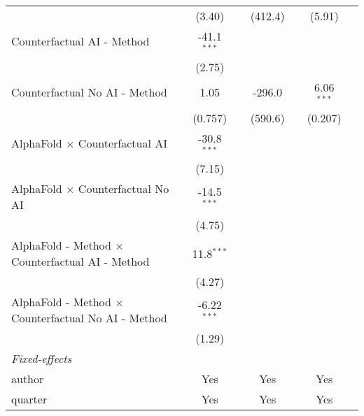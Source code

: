 \begin{tabular}{lcccccc}
                                                              & (3.40)        &      & (412.4)      &      & (5.91)        &   \\   
   Counterfactual AI - Method                                 & -41.1$^{***}$ &      &              &      &               &   \\   
                                                              & (2.75)        &      &              &      &               &   \\   
   Counterfactual No AI - Method                              & 1.05          &      & -296.0       &      & 6.06$^{***}$  &   \\   
                                                              & (0.757)       &      & (590.6)      &      & (0.207)       &   \\   
   AlphaFold $\times$ Counterfactual AI                       & -30.8$^{***}$ &      &              &      &               &   \\   
                                                              & (7.15)        &      &              &      &               &   \\   
   AlphaFold $\times$ Counterfactual No AI                    & -14.5$^{***}$ &      &              &      &               &   \\   
                                                              & (4.75)        &      &              &      &               &   \\   
   AlphaFold - Method $\times$ Counterfactual AI - Method     & 11.8$^{***}$  &      &              &      &               &   \\   
                                                              & (4.27)        &      &              &      &               &   \\   
   AlphaFold - Method $\times$ Counterfactual No AI - Method  & -6.22$^{***}$ &      &              &      &               &   \\   
                                                              & (1.29)        &      &              &      &               &   \\   
   \midrule
   \emph{Fixed-effects}\\
   author                                                     & Yes           &      & Yes          &      & Yes           & \\  
   quarter                                                    & Yes           &      & Yes          &      & Yes           & \\  

\end{tabular}
